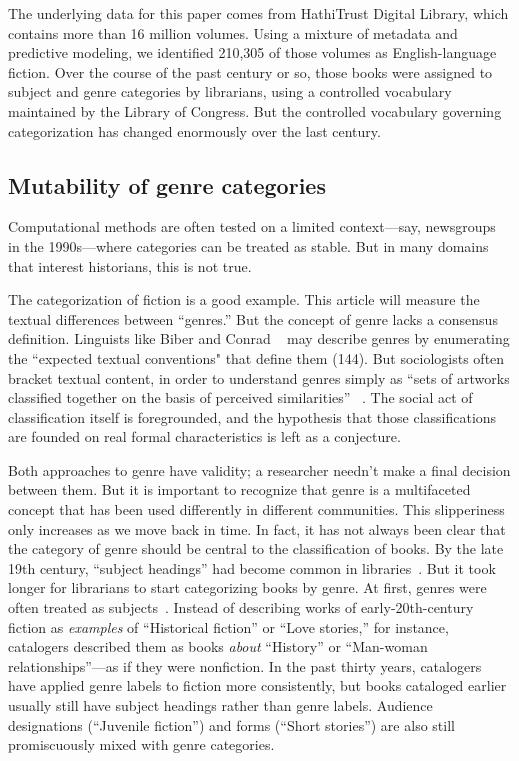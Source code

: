 \documentclass[11pt]{article}
\begin{document}
The underlying data for this paper comes from HathiTrust Digital Library, which contains more than 16 million volumes. Using a mixture of metadata and predictive modeling, we identified 210,305 of those volumes as English-language fiction. Over the course of the past century or so, those books were assigned to subject and genre categories by librarians, using a controlled vocabulary maintained by the Library of Congress. But the controlled vocabulary governing categorization has changed enormously over the last century. 

\subsection{Mutability of genre categories}
Computational methods are often tested on a limited context---say, newsgroups in the 1990s---where categories can be treated as stable. But in many domains that interest historians, this is not true.

The categorization of fiction is a good example. This article will measure the textual differences between ``genres.'' But the concept of genre lacks a consensus definition. Linguists like Biber and Conrad ~ may describe genres by enumerating the ``expected textual conventions" that define them (144). But sociologists often bracket textual content, in order to understand genres simply as ``sets of artworks classified together on the basis of perceived similarities'' ~\cite{dimaggio:genre}. The social act of classification itself is foregrounded, and the hypothesis that those classifications are founded on real formal characteristics is left as a conjecture.

Both approaches to genre have validity; a researcher needn't make a final decision between them. But it is important to recognize that genre is a multifaceted concept that has been used differently in different communities. This slipperiness only increases as we move back in time. In fact, it has not always been clear that the category of genre should be central to the classification of books. By the late 19th century, ``subject headings'' had become common in libraries~\cite{stone:lcsh}. But it took longer for librarians to start categorizing books by genre. At first, genres were often treated as subjects~\cite{miller:genre}. Instead of describing works of early-20th-century fiction as \textit{examples} of ``Historical fiction'' or ``Love stories,'' for instance, catalogers described them as books \textit{about} ``History'' or ``Man-woman relationships''---as if they were nonfiction. In the past thirty years, catalogers have applied genre labels to fiction more consistently, but books cataloged earlier usually still have subject headings rather than genre labels. Audience designations (``Juvenile fiction'') and forms (``Short stories'') are also still promiscuously mixed with genre categories.
\end{document}
